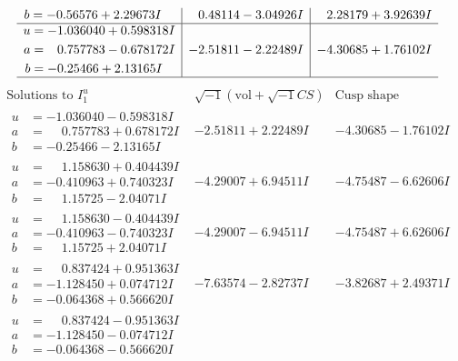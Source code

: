 \documentclass[1p]{elsarticle_modified}
\theoremstyle{definition}
\newcommand{\I}{\sqrt{-1}}
\begin{document}
$$\begin{array}{c|c|c}
\begin{aligned}
b &= -0.56576 + 2.29673 I\end{aligned}
 & \phantom{-}0.48114 - 3.04926 I & \phantom{-}2.28179 + 3.92639 I \\ \hline\begin{aligned}
u &= -1.036040 + 0.598318 I \\
a &= \phantom{-}0.757783 - 0.678172 I \\
b &= -0.25466 + 2.13165 I\end{aligned}
 & -2.51811 - 2.22489 I & -4.30685 + 1.76102 I\\
 \hline 
 \end{array}$$\newpage$$\begin{array}{c|c|c}  
\text{Solutions to }I^u_{1}& \I (\text{vol} + \sqrt{-1}CS) & \text{Cusp shape}\\
 \hline 
\begin{aligned}
u &= -1.036040 - 0.598318 I \\
a &= \phantom{-}0.757783 + 0.678172 I \\
b &= -0.25466 - 2.13165 I\end{aligned}
 & -2.51811 + 2.22489 I & -4.30685 - 1.76102 I \\ \hline\begin{aligned}
u &= \phantom{-}1.158630 + 0.404439 I \\
a &= -0.410963 + 0.740323 I \\
b &= \phantom{-}1.15725 - 2.04071 I\end{aligned}
 & -4.29007 + 6.94511 I & -4.75487 - 6.62606 I \\ \hline\begin{aligned}
u &= \phantom{-}1.158630 - 0.404439 I \\
a &= -0.410963 - 0.740323 I \\
b &= \phantom{-}1.15725 + 2.04071 I\end{aligned}
 & -4.29007 - 6.94511 I & -4.75487 + 6.62606 I \\ \hline\begin{aligned}
u &= \phantom{-}0.837424 + 0.951363 I \\
a &= -1.128450 + 0.074712 I \\
b &= -0.064368 + 0.566620 I\end{aligned}
 & -7.63574 - 2.82737 I & -3.82687 + 2.49371 I \\ \hline\begin{aligned}
u &= \phantom{-}0.837424 - 0.951363 I \\
a &= -1.128450 - 0.074712 I \\
b &= -0.064368 - 0.566620 I\end{aligned}

\end{array}$$
\end{document}
